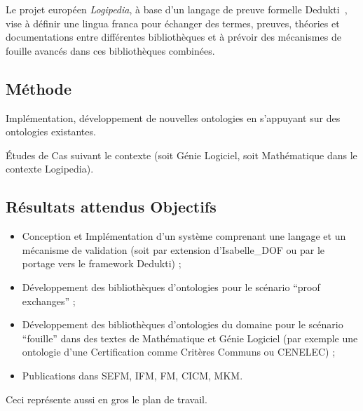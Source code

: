 \documentclass[a4paper,10pt]{article}
\begin{document}
Le projet européen \emph{Logipedia},
à base d'un langage de preuve formelle Dedukti~\cite{dedukti}, vise
à définir une lingua franca
pour échanger des termes, preuves, théories et documentations
entre différentes bibliothèques
et à prévoir des mécanismes de fouille avancés
dans ces bibliothèques combinées.

\subsection*{Méthode}

Implémentation, développement de nouvelles ontologies
en s'appuyant sur des ontologies existantes.

Études de Cas suivant le contexte
(soit Génie Logiciel, soit Mathématique dans le contexte Logipedia).

\subsection*{Résultats attendus \textendash{}  Objectifs}

\begin{itemize}
  \item
    Conception et Implémentation d'un système comprenant
    une langage et un mécanisme de validation
    (soit par extension d'Isabelle\_DOF
    ou par le portage vers le framework Dedukti) ;
  \item
    Développement des bibliothèques d'ontologies
    pour le scénario \enquote{proof exchanges} ;
  \item
    Développement des bibliothèques d'ontologies du domaine
    pour le scénario \enquote{fouille} dans des textes
    de Mathématique et Génie Logiciel
    (par exemple une ontologie
    d'une Certification comme Critères Communs ou CENELEC) ;
  \item
    Publications dans SEFM, IFM, FM, CICM, MKM\@.
\end{itemize}

Ceci représente aussi en gros le plan de travail.



\end{document}
